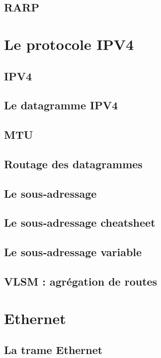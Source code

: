 \documentclass[12pt]{article}
\begin{document}
\subsection{RARP}

\section{Le protocole IPV4}

\subsection{IPV4}

\subsection{Le datagramme IPV4}

\subsection{MTU}

\subsection{Routage des datagrammes}

\subsection{Le sous‐adressage}

\subsection{Le sous‐adressage cheatsheet}

\subsection{Le sous‐adressage variable}

\subsection{VLSM : agrégation de routes}

\section{Ethernet}

\subsection{La trame Ethernet}
\end{document}
